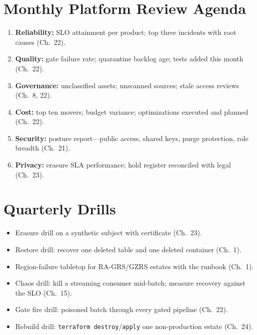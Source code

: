 \section{Monthly Platform Review Agenda}
\begin{enumerate}
    \item \textbf{Reliability:} SLO attainment per product; top three incidents with root causes (Ch.~22).
    \item \textbf{Quality:} gate failure rate; quarantine backlog age; tests added this month (Ch.~22).
    \item \textbf{Governance:} unclassified assets; unscanned sources; stale access reviews (Ch.~8, 22).
    \item \textbf{Cost:} top ten movers; budget variance; optimizations executed and planned (Ch.~22).
    \item \textbf{Security:} posture report---public access, shared keys, purge protection, role breadth (Ch.~21).
    \item \textbf{Privacy:} erasure SLA performance; hold register reconciled with legal (Ch.~23).
\end{enumerate}

\section{Quarterly Drills}
\begin{itemize}
    \item[$\square$] Erasure drill on a synthetic subject with certificate (Ch.~23).
    \item[$\square$] Restore drill: recover one deleted table and one deleted container (Ch.~1).
    \item[$\square$] Region-failure tabletop for RA-GRS/GZRS estates with the runbook (Ch.~1).
    \item[$\square$] Chaos drill: kill a streaming consumer mid-batch; measure recovery against the SLO (Ch.~15).
    \item[$\square$] Gate fire drill: poisoned batch through every gated pipeline (Ch.~22).
    \item[$\square$] Rebuild drill: \texttt{terraform destroy}/\texttt{apply} one non-production estate (Ch.~24).
\end{itemize}
